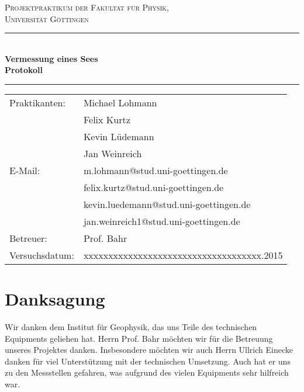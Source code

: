 \documentclass[12pt,a4paper,titlepage,headinclude,bibtotoc]{scrartcl}
\begin{document}
\begin{titlepage}
\centering
\textsc{\Large Projektpraktikum der Fakultät für
  Physik,\\[1ex] Universität Göttingen}

\vspace*{2cm}

\rule{\textwidth}{1pt}\\[0.5cm]
{\huge \bfseries
  Vermessung eines Sees \\[1ex]
  Protokoll}\\[0.5cm]
\rule{\textwidth}{1pt}

\vspace*{2cm}

\begin{Large}
\begin{tabular}{ll}
Praktikanten: &  Michael Lohmann\\
 &  Felix Kurtz\\
 &  Kevin Lüdemann\\
 &  Jan Weinreich\\
 E-Mail: & m.lohmann@stud.uni-goettingen.de\\
 &  felix.kurtz@stud.uni-goettingen.de\\
 &  kevin.luedemann@stud.uni-goettingen.de\\
 &  jan.weinreich1@stud.uni-goettingen.de\\
 Betreuer: & Prof. Bahr\\
 Versuchsdatum: & xxxxxxxxxxxxxxxxxxxxxxxxxxxxxxxxxxxx.2015\\
\end{tabular}
\end{Large}

\vspace*{0.8cm}

\begin{Large}
\end{Large}

\end{titlepage}

\tableofcontents

\newpage

\section*{Danksagung}
Wir danken dem Institut für Geophysik, das uns Teile des technischen Equipments geliehen hat.
Herrn Prof. Bahr möchten wir für die Betreuung unseres Projektes danken.
Insbesondere möchten wir auch Herrn Ullrich Einecke danken für viel Unterstützung mit der technischen Umsetzung.
Auch hat er uns zu den Messstellen gefahren, was aufgrund des vielen Equipments sehr hilfreich war.
\end{document}
